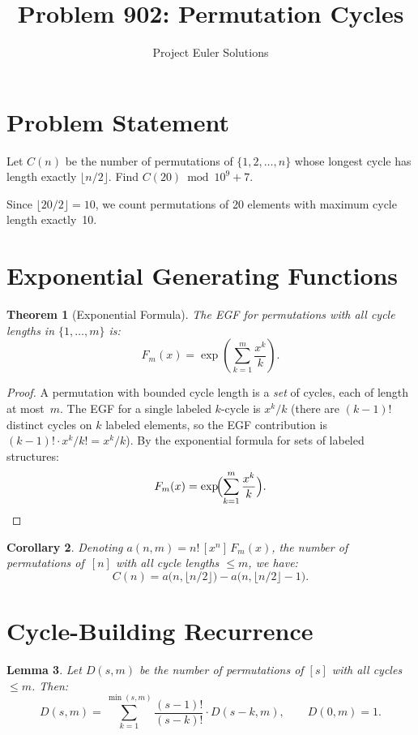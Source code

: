 \documentclass[11pt]{article}
\title{Problem 902: Permutation Cycles}
\author{Project Euler Solutions}
\date{}
\newtheorem{theorem}{Theorem}
\newtheorem{lemma}[theorem]{Lemma}
\newtheorem{corollary}[theorem]{Corollary}
\begin{document}
\maketitle

\section{Problem Statement}

Let $C(n)$ be the number of permutations of $\{1,2,\ldots,n\}$ whose longest cycle has length exactly $\lfloor n/2 \rfloor$. Find $C(20) \bmod 10^9+7$.

Since $\lfloor 20/2 \rfloor = 10$, we count permutations of 20 elements with maximum cycle length exactly~10.

\section{Exponential Generating Functions}

\begin{theorem}[Exponential Formula]
The EGF for permutations with all cycle lengths in $\{1,\ldots,m\}$ is:
\[
F_m(x) = \exp\!\left(\sum_{k=1}^{m} \frac{x^k}{k}\right).
\]
\end{theorem}

\begin{proof}
A permutation with bounded cycle length is a \emph{set} of cycles, each of length at most~$m$. The EGF for a single labeled $k$-cycle is $x^k/k$ (there are $(k-1)!$ distinct cycles on $k$ labeled elements, so the EGF contribution is $(k-1)! \cdot x^k/k! = x^k/k$). By the exponential formula for sets of labeled structures:
\[
F_m(x) = \exp\!\Bigl(\sum_{k=1}^{m} \frac{x^k}{k}\Bigr). \qedhere
\]
\end{proof}

\begin{corollary}
Denoting $a(n,m) = n!\,[x^n]\,F_m(x)$, the number of permutations of~$[n]$ with all cycle lengths $\le m$, we have:
\[
C(n) = a\bigl(n, \lfloor n/2 \rfloor\bigr) - a\bigl(n, \lfloor n/2 \rfloor - 1\bigr).
\]
\end{corollary}

\section{Cycle-Building Recurrence}

\begin{lemma}
Let $D(s, m)$ be the number of permutations of $[s]$ with all cycles $\le m$. Then:
\[
D(s, m) = \sum_{k=1}^{\min(s,m)} \frac{(s-1)!}{(s-k)!} \cdot D(s-k, m), \qquad D(0, m) = 1.
\]
\end{lemma}
\end{document}
